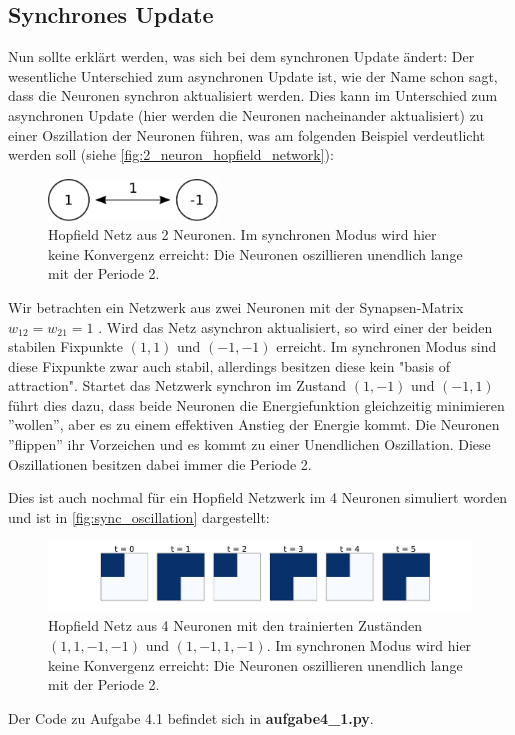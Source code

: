 \subsection{Synchrones Update} \label{ssec:synchronesupdate}
Nun sollte erklärt werden, was sich bei dem synchronen Update ändert: Der wesentliche Unterschied zum asynchronen Update ist, wie der Name schon sagt, dass die Neuronen synchron aktualisiert werden. Dies kann im Unterschied zum asynchronen Update (hier werden die Neuronen nacheinander aktualisiert) zu einer Oszillation der Neuronen führen, was am folgenden Beispiel verdeutlicht werden soll (siehe \autoref{fig:2_neuron_hopfield_network}): 

\begin{figure}[htp]
	\centering
	\includegraphics[width = 0.4\textwidth]{images/2_neuron_hopfield_network.pdf}
	\caption{Hopfield Netz aus 2 Neuronen. Im synchronen Modus wird hier keine Konvergenz erreicht: Die Neuronen oszillieren unendlich lange mit der Periode 2.}
	\label{fig:2_neuron_hopfield_network}
\end{figure}

Wir betrachten ein Netzwerk aus zwei Neuronen mit der Synapsen-Matrix $w_{12} = w_{21} = 1$ . Wird das Netz asynchron aktualisiert, so wird einer der  beiden stabilen Fixpunkte $(1,1)$ und $(-1,-1)$ erreicht. Im synchronen Modus sind diese Fixpunkte zwar auch stabil, allerdings besitzen diese kein "basis of attraction". Startet das Netzwerk synchron im Zustand $(1,-1)$ und $(-1,1)$ führt dies dazu, dass beide Neuronen die Energiefunktion gleichzeitig minimieren ''wollen'', aber es zu einem effektiven Anstieg der Energie kommt. Die Neuronen ''flippen'' ihr Vorzeichen und es kommt zu einer Unendlichen Oszillation. Diese Oszillationen besitzen dabei immer die Periode 2.

Dies ist auch nochmal für ein Hopfield Netzwerk im 4 Neuronen simuliert worden und ist in \autoref{fig:sync_oscillation} dargestellt:

\begin{figure}[htp]
	\centering
	\includegraphics[width = \textwidth]{images/sync_oscillation.pdf}
	\caption{Hopfield Netz aus 4 Neuronen mit den trainierten Zuständen $(1,1,-1,-1)$ und $(1,-1,1,-1)$. Im synchronen Modus wird hier keine Konvergenz erreicht: Die Neuronen oszillieren unendlich lange mit der Periode 2.}
	\label{fig:sync_oscillation}
\end{figure}

Der Code zu Aufgabe 4.1 befindet sich in \textbf{aufgabe4\_1.py}.


\clearpage